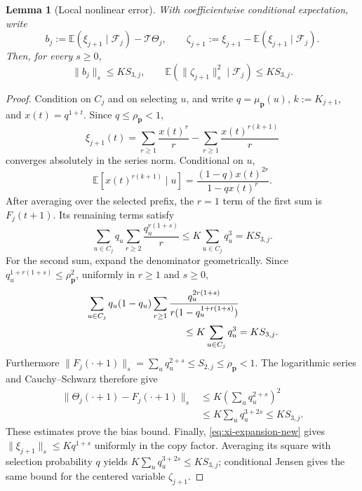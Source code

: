 \documentclass[journal]{IEEEtran}
\theoremstyle{plain}
\newtheorem{lemma}[theorem]{Lemma}
\theoremstyle{definition}
\theoremstyle{remark}
\newcommand{\F}{\mathcal F}
\newcommand{\muP}{\mu_{\mathbf p}}
\newcommand{\rhoP}{\rho_{\mathbf p}}
\begin{document}
\begin{lemma}[Local nonlinear error]\label{lem:local-error-new}
With coefficientwise conditional expectation, write
\begin{equation*}
 b_j:=\mathbb E(\xi_{j+1}\mid\F_j)-\mathcal T\Theta_j,
 \qquad
 \zeta_{j+1}:=\xi_{j+1}-\mathbb E(\xi_{j+1}\mid\F_j).
\end{equation*}
Then, for every $s\ge0$,
\begin{equation}\label{eq:local-bounds-new}
 \|b_j\|_s\le KS_{3,j},
 \qquad
 \mathbb E(\|\zeta_{j+1}\|_s^2\mid\F_j)\le KS_{3,j}.
\end{equation}
\end{lemma}

\begin{proof}
Condition on $C_j$ and on selecting $u$, and write $q=\muP(u)$, $k:=K_{j+1}$, and $x(t)=q^{1+t}$.  Since $q\le\rhoP<1$,
\begin{equation}\label{eq:xi-expansion-new}
 \xi_{j+1}(t)
 =\sum_{r\ge1}\frac{x(t)^r}{r}
 -\sum_{r\ge1}\frac{x(t)^{r(k+1)}}r
\end{equation}
converges absolutely in the series norm.  Conditional on $u$,
\begin{equation*}
 \mathbb E[x(t)^{r(k+1)}\mid u]
 =\frac{(1-q)x(t)^{2r}}{1-qx(t)^r}.
\end{equation*}
After averaging over the selected prefix, the $r=1$ term of the first sum is $F_j(t+1)$.  Its remaining terms satisfy
\begin{equation*}
 \sum_{u\in C_j}q_u\sum_{r\ge2}\frac{q_u^{r(1+s)}}r
 \le K\sum_{u\in C_j}q_u^3=KS_{3,j}.
\end{equation*}
For the second sum, expand the denominator geometrically.  Since
$q_u^{1+r(1+s)}\le\rhoP^2$, uniformly in $r\ge1$ and $s\ge0$,
\begin{align*}
 &\sum_{u\in C_j}q_u(1-q_u)\sum_{r\ge1}
 \frac{q_u^{2r(1+s)}}{r(1-q_u^{1+r(1+s)})}\\
 &\hspace{35mm}\le K\sum_{u\in C_j}q_u^3=KS_{3,j}.
\end{align*}
Furthermore $\|F_j(\cdot+1)\|_s=\sum_uq_u^{2+s}\le S_{2,j}\le\rhoP<1$.  The logarithmic series and Cauchy--Schwarz therefore give
\begin{align*}
 \|\Theta_j(\cdot+1)-F_j(\cdot+1)\|_s
 &\le K\left(\sum_uq_u^{2+s}\right)^2\\
 &\le K\sum_uq_u^{3+2s}\le KS_{3,j}.
\end{align*}
These estimates prove the bias bound.  Finally, \eqref{eq:xi-expansion-new} gives $\|\xi_{j+1}\|_s\le Kq^{1+s}$ uniformly in the copy factor.  Averaging its square with selection probability $q$ yields $K\sum_uq_u^{3+2s}\le KS_{3,j}$; conditional Jensen gives the same bound for the centered variable $\zeta_{j+1}$.
\end{proof}
\end{document}
